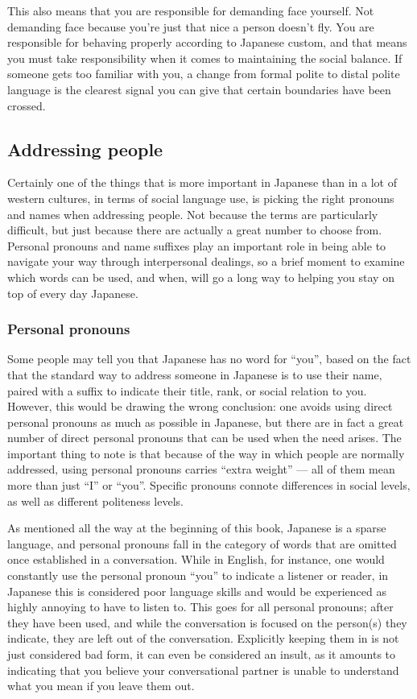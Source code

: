 \documentclass[11pt, b5paper, twoside, openright, onecolumn]{book}
\begin{document}
This also means that you are responsible for demanding face yourself. Not demanding face because you’re just that nice a person doesn’t fly. You are responsible for behaving properly according to Japanese custom‚ and that means you must take responsibility when it comes to maintaining the social balance. If someone gets too familiar with you‚ a change from formal polite to distal polite language is the clearest signal you can give that certain boundaries have been crossed.

\subsection{Addressing people}

Certainly one of the things that is more important in Japanese than in a lot of  western cultures‚ in terms of social language use‚ is picking the right pronouns and names when addressing people. Not because the terms are particularly difficult‚ but just because there are actually a great number to choose from. Personal pronouns and name suffixes play an important role in being able to navigate your way through interpersonal dealings‚ so a brief moment to examine which words can be used‚ and when‚ will go a long way to helping you stay on top of every day Japanese.

\subsubsection{Personal pronouns}

Some people may tell you that Japanese has no word for “you”‚ based on the fact that the standard way to address someone in Japanese is to use their name‚ paired with a suffix to indicate their title‚ rank‚ or social relation to you. However‚ this would be drawing the wrong conclusion: one avoids using direct personal pronouns as much as possible in Japanese‚ but there are in fact a great number of direct personal pronouns that can be used when the need arises. The important thing to note is that because of the way in which people are normally addressed‚ using personal pronouns carries “extra weight” — all of them mean more than just “I” or “you”. Specific pronouns connote differences in social levels‚ as well as different politeness levels.

As mentioned all the way at the beginning of this book‚ Japanese is a sparse language‚ and personal pronouns fall in the category of words that are omitted once established in a conversation. While in English‚ for instance‚ one would constantly use the personal pronoun “you” to indicate a listener or reader‚ in Japanese this is considered poor language skills and would be experienced as highly annoying to have to listen to. This goes for all personal pronouns; after they have been used‚ and while the conversation is focused on the person(s) they indicate‚ they are left out of the conversation. Explicitly keeping them in is not just considered bad form‚ it can even be considered an insult‚ as it amounts to indicating that you believe your conversational partner is unable to understand what you mean if you leave them out.
\end{document}
